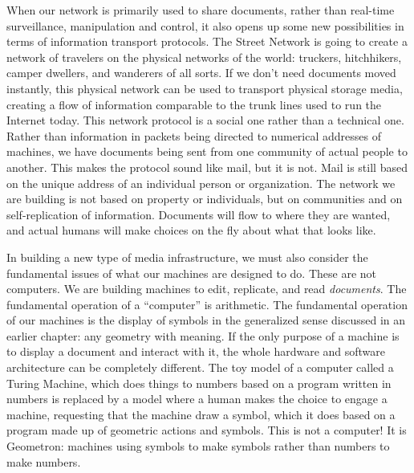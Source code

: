 When our network is primarily used to share documents, rather than real-time surveillance, manipulation and control, it also opens up some new possibilities in terms of information transport protocols.  The Street Network is going to create a network of travelers on the physical networks of the world: truckers, hitchhikers, camper dwellers, and wanderers of all sorts.  If we don't need documents moved instantly, this physical network can be used to transport physical storage media, creating a flow of information comparable to the trunk lines used to run the Internet today.  This network protocol is a social one rather than a technical one. Rather than information in packets being directed to numerical addresses of machines, we have documents being sent from one community of actual people to another.  This makes the protocol sound like mail, but it is not.  Mail is still based on the unique address of an individual person or organization.  The network we are building is not based on property or individuals, but on communities and on self-replication of information.  Documents will flow to where they are wanted, and actual humans will make choices on the fly about what that looks like.

In building a new type of media infrastructure, we must also consider the fundamental issues of what our machines are designed to do.  These are not computers.  We are building machines to edit, replicate, and read \emph{documents}.  The fundamental operation of a ``computer'' is arithmetic.  The fundamental operation of our machines is the display of symbols in the generalized sense discussed in an earlier chapter: any geometry with meaning.  If the only purpose of a machine is to display a document and interact with it, the whole hardware and software architecture can be completely different.  The toy model of a computer called a Turing Machine, which does things to numbers based on a program written in numbers is replaced by a model where a human makes the choice to engage a machine, requesting that the machine draw a symbol, which it does based on a program made up of geometric actions and symbols.  This is not a computer! It is Geometron: machines using symbols to make symbols rather than numbers to make numbers.

